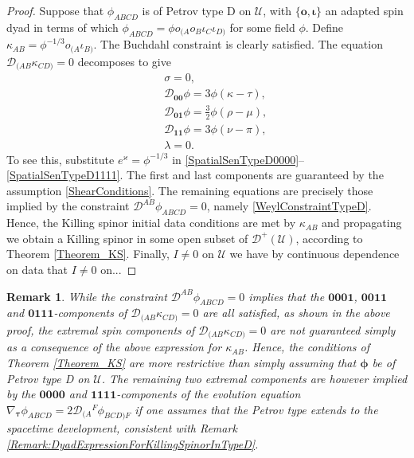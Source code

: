 \documentclass[10pt,a4paper]{article}
\theoremstyle{plain}
\newtheorem{remark}{Remark}
\def\bmo{{\bm o}}
\begin{document}
\begin{proof}
Suppose that $\phi_{ABCD}$ is of Petrov type D on $\mathcal{U}$, with $\lbrace \bmo, \bm\iota\rbrace$ an adapted spin dyad in terms of which $\phi_{ABCD}=\phi o_{(A}o_B\iota_C\iota_{D)}$ for some field $\phi$. Define $\kappa_{AB}=\phi^{-1/3}o_{(A}\iota_{B)}$. The Buchdahl constraint is clearly satisfied. The equation $\mathcal{D}_{(AB}\kappa_{CD)}=0$ decomposes to give 
\begin{eqnarray*}
&& \sigma=0,\\
&& \mathcal{D}_{\bm0\bm0}\phi = 3\phi(\kappa - \tau), \\
&& \mathcal{D}_{\bm0\bm1}\phi = \tfrac{3}{2} \phi(\rho - \mu),\\
&& \mathcal{D}_{\bm1\bm1}\phi = 3\phi(\nu - \pi), \\
&& \lambda = 0.
\end{eqnarray*}
To see this, substitute $e^{\varkappa}=\phi^{-1/3}$ in \eqref{SpatialSenTypeD0000}--\eqref{SpatialSenTypeD1111}.
The first and last components are guaranteed by the assumption \eqref{ShearConditions}.
The remaining equations are precisely those implied by the constraint $\mathcal{D}^{AB}\phi_{ABCD}=0$, namely  \eqref{WeylConstraintTypeD}.
Hence, the Killing spinor initial data conditions are met by $\kappa_{AB}$ and propagating we obtain a Killing spinor in some open subset of $\mathcal{D}^+(\mathcal{U})$, according to Theorem \ref{Theorem_KS}. Finally, $I\neq 0$ on $\mathcal{U}$ we have by continuous dependence on data that $I\neq 0$ on...
\end{proof}

\begin{remark}{\em 
 While the constraint $\mathcal{D}^{AB}\phi_{ABCD}=0$ implies that the $\bm0\bm0\bm0\bm1$, $\bm0\bm0\bm1\bm1$ and $\bm0\bm1\bm1\bm1$-components of $\mathcal{D}_{(AB}\kappa_{CD)}=0$
  are all satisfied, as shown in the above proof, the extremal spin components of $\mathcal{D}_{(AB}\kappa_{CD)}=0$ are not guaranteed simply as a consequence of the above expression for $\kappa_{AB}$. Hence, the conditions of Theorem \ref{Theorem_KS} are more restrictive than simply assuming that $\bm\phi$ be of Petrov type D on $\mathcal{U}$. The remaining two extremal components are however implied by the $\bm0\bm0\bm0\bm0$ and $\bm1\bm1\bm1\bm1$-components of the \emph{evolution equation} $\nabla_{\bm\tau}\phi_{ABCD}=2\mathcal{D}_{(A}{}^F\phi_{BCD)F}$ \emph{if} one assumes that the Petrov type extends to the spacetime development, consistent with Remark \ref{Remark:DyadExpressionForKillingSpinorInTypeD}.
  }
\end{remark}
\end{document}
